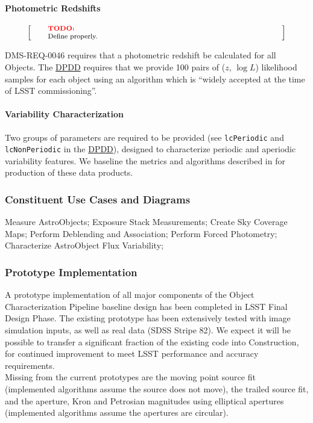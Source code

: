\documentclass[12pt]{article}
\newcommand{\ds}[2]{{\color{blue} \href{https://docushare.lsstcorp.org/docushare/dsweb/Get/#1}{#2}}\xspace}
\newcommand{\DPDD}{\ds{LSE-163}{DPDD}}
\newenvironment{note}[1][Note]
{
  \begin{displaymath}
    \left[ \qquad
    \begin{minipage}[h]{.75\linewidth}
      \color{red} \footnotesize
      \textbf{#1:} \newline
      \color{black}
}
{
    \end{minipage}
    \normalsize
    \qquad \right]
  \end{displaymath}
}
\begin{document}
\paragraph{Photometric Redshifts}
\label{alg:photoz}

\begin{note}[TODO]
Define properly.
\end{note}

DMS-REQ-0046 requires that a photometric redshift be calculated for all Objects. The \DPDD{} requires that we provide 100 pairs of ($z$, $\log L$) likelihood samples for each object using an algorithm which is ``widely accepted at the time of LSST commissioning''.

\paragraph{Variability Characterization}

Two groups of parameters are required to be provided (see {\tt lcPeriodic} and {\tt lcNonPeriodic} in the \DPDD), designed to characterize periodic and aperiodic variability features. We baseline the metrics and algorithms described in \cite{Richards11} for production of these data products.

\subsubsection{Constituent Use Cases and Diagrams}

Measure AstroObjects; Exposure Stack Measurements;
Create Sky Coverage Maps; Perform Deblending and Association; Perform Forced Photometry; Characterize AstroObject Flux Variability;

\subsubsection{Prototype Implementation}

A prototype implementation of all major components of the Object Characterization Pipeline baseline design has been completed in LSST Final Design Phase. The existing prototype has been extensively tested with image simulation inputs, as well as real data (SDSS Stripe 82). We expect it will be possible to transfer a significant fraction of the existing code into Construction, for continued improvement to meet LSST performance and accuracy requirements.
\\

Missing from the current prototypes are the moving point source fit (implemented algorithms assume the source does not move), the trailed source fit, and the aperture, Kron and Petrosian magnitudes using elliptical apertures (implemented algorithms assume the apertures are circular).
\\
\end{document}
